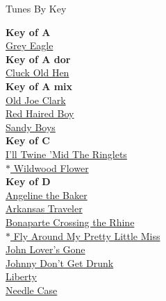 \documentclass{book}
\begin{document}
\noindent
\begin{center}
\large{Tunes By Key} \\
\end{center}
\textbf{Key of A} \\
\-\hspace{4ex}\hyperlink{tunes.4}{Grey Eagle} \\
\textbf{Key of A dor} \\
\-\hspace{4ex}\hyperlink{tunes.3}{Cluck Old Hen} \\
\textbf{Key of A mix} \\
\-\hspace{4ex}\hyperlink{tunes.9}{Old Joe Clark} \\
\-\hspace{4ex}\hyperlink{tunes.10}{Red Haired Boy} \\
\-\hspace{4ex}\hyperlink{tunes.11}{Sandy Boys} \\
\textbf{Key of C} \\
\-\hspace{4ex}\hyperlink{tunes.6}{I'll Twine 'Mid The Ringlets} \\
\-\hspace{4ex}\hyperlink{tunes.6}{$\ast$ Wildwood Flower} \\
\textbf{Key of D} \\
\-\hspace{4ex}\hyperlink{tunes.1}{Angeline the Baker} \\
\-\hspace{4ex}\hyperlink{tunes.1}{Arkansas Traveler} \\
\-\hspace{4ex}\hyperlink{tunes.3}{Bonaparte Crossing the Rhine} \\
\-\hspace{4ex}\hyperlink{tunes.12}{$\ast$ Fly Around My Pretty Little Miss} \\
\-\hspace{4ex}\hyperlink{tunes.7}{John Lover's Gone} \\
\-\hspace{4ex}\hyperlink{tunes.7}{Johnny Don't Get Drunk} \\
\-\hspace{4ex}\hyperlink{tunes.8}{Liberty} \\
\-\hspace{4ex}\hyperlink{tunes.8}{Needle Case} \\
\end{document}

